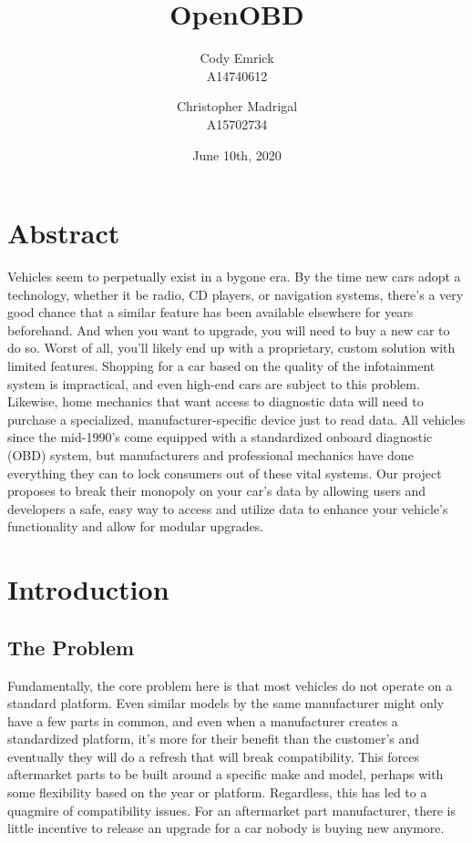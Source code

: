 \documentclass[10pt,letterpaper,unboxed,cm]{article}
\title{OpenOBD}
\date{June 10th, 2020}
\author{Cody Emrick\\A14740612 \and Christopher Madrigal\\A15702734}
\renewcommand{\thefootnote}{\fnsymbol{footnote}}
\newcommand\blfootnote[1]{%
  \begingroup
  \renewcommand\thefootnote{}\footnote{#1}%
  \addtocounter{footnote}{-1}%
  \endgroup
}
\begin{document}
\maketitle


\renewcommand*{\thefootnote}{\arabic{footnote}}

\tableofcontents
\newpage

\section{Abstract}

Vehicles seem to perpetually exist in a bygone era. By the time new cars adopt a technology, whether it be radio, CD players, or navigation systems, there's a very good chance that a similar feature has been available elsewhere for years beforehand. And when you want to upgrade, you will need to buy a new car to do so. Worst of all, you'll likely end up with a proprietary, custom solution with limited features. Shopping for a car based on the quality of the infotainment system is impractical, and even high-end cars are subject to this problem. Likewise, home mechanics that want access to diagnostic data will need to purchase a specialized, manufacturer-specific device just to read data. All vehicles since the mid-1990's come equipped with a standardized onboard diagnostic (OBD) system, but manufacturers and professional mechanics have done everything they can to lock consumers out of these vital systems. Our project proposes to break their monopoly on your car's data by allowing users and developers a safe, easy way to access and utilize data to enhance your vehicle's functionality and allow for modular upgrades.

\section{Introduction}

\subsection{The Problem}

Fundamentally, the core problem here is that most vehicles do not operate on a standard platform. Even similar models by the same manufacturer might only have a few parts in common, and even when a manufacturer creates a standardized platform, it's more for their benefit than the customer's and eventually they will do a refresh that will break compatibility. This forces aftermarket parts to be built around a specific make and model, perhaps with some flexibility based on the year or platform. Regardless, this has led to a quagmire of compatibility issues. For an aftermarket part manufacturer, there is little incentive to release an upgrade for a car nobody is buying new anymore. 
\end{document}

